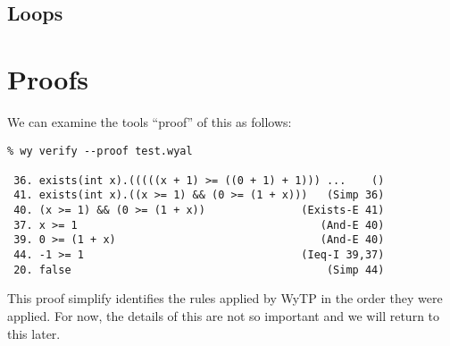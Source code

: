 \subsection{Loops}


\section{Proofs}

We can examine the tools ``proof'' of this as follows:
\begin{verbatim}
% wy verify --proof test.wyal

 36. exists(int x).(((((x + 1) >= ((0 + 1) + 1))) ...    () 
 41. exists(int x).((x >= 1) && (0 >= (1 + x)))   (Simp 36) 
 40. (x >= 1) && (0 >= (1 + x))               (Exists-E 41) 
 37. x >= 1                                      (And-E 40) 
 39. 0 >= (1 + x)                                (And-E 40) 
 44. -1 >= 1                                  (Ieq-I 39,37) 
 20. false                                        (Simp 44) 
\end{verbatim}
This proof simplify identifies the rules applied by WyTP in the order
they were applied.  For now, the details of this are not so important
and we will return to this later.
